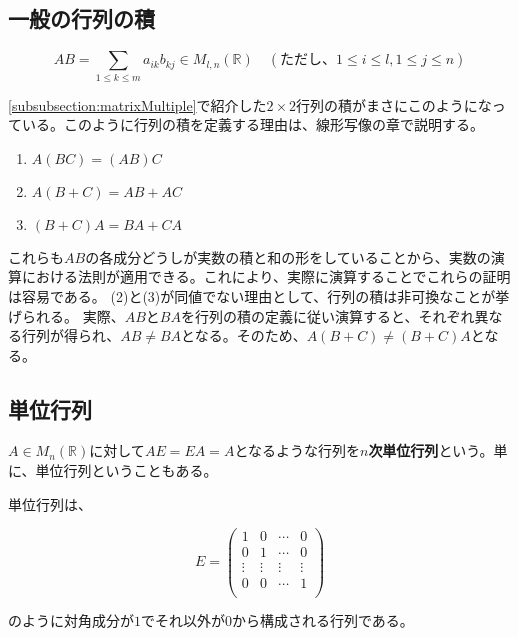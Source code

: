 \documentclass[dvipdfmx,autodetect-engine]{jsarticle}
\theoremstyle{definition}
\begin{document}
\subsection{一般の行列の積}

\label{defi:matrixMultiple}

$$
AB = \sum_{1 \leq k \leq m} a_{ik}b_{kj} \in M_{l, n}(\mathbb{R})
\quad (ただし、1 \leq i \leq l, 1 \leq j \leq n)
$$

\ref{subsubsection:matrixMultiple}で紹介した$2 \times 2$行列の積がまさにこのようになっている。このように行列の積を定義する理由は、線形写像の章で説明する。


\begin{enumerate}
\renewcommand{\labelenumi}{(\arabic{enumi})}
\item $A(BC) = (AB)C$
\item $A(B+C) = AB + AC$
\item $(B+C)A = BA + CA$
\end{enumerate}

これらも$AB$の各成分どうしが実数の積と和の形をしていることから、実数の演算における法則が適用できる。これにより、実際に演算することでこれらの証明は容易である。
(2)と(3)が同値でない理由として、行列の積は非可換なことが挙げられる。
実際、$AB$と$BA$を行列の積の定義に従い演算すると、それぞれ異なる行列が得られ、$AB \neq BA$となる。そのため、$A(B+C) \neq (B+C)A$となる。

\subsection{単位行列}


$A \in M_n(\mathbb{R})$に対して$AE = EA = A$となるような行列を{\bf $n$次単位行列}という。単に、単位行列ということもある。

単位行列は、

$$
E = \begin{pmatrix}
1 & 0 & \cdots & 0 \\
0 & 1 & \cdots & 0 \\
\vdots & \vdots & \vdots & \vdots \\
0 & 0 & \cdots & 1 \\
\end{pmatrix}
$$

のように対角成分が$1$でそれ以外が$0$から構成される行列である。
\end{document}
